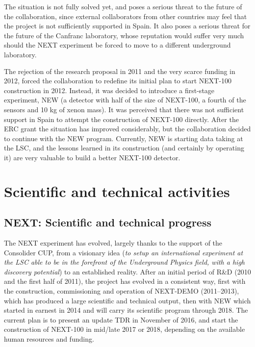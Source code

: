 \documentclass[a4paper,11pt,oneside]{article}
\begin{document}
The situation is not fully solved yet, and poses a serious threat to the future of the collaboration, since external collaborators from other countries may feel that the project is not sufficiently supported in Spain. It also poses a serious threat for the future of the Canfranc laboratory, whose reputation would suffer very much should the NEXT experiment be forced to move to a different underground laboratory. 

The rejection of the research proposal in 2011 and the very scarce funding in 2012, forced the collaboration to redefine its initial plan to start NEXT-100 construction in 2012. Instead, it was decided to introduce a first-stage experiment, NEW (a detector with half of the size of NEXT-100, a fourth of the sensors and 10 kg of xenon mass). It was perceived that there was not sufficient support in Spain to attempt the construction of NEXT-100 directly. After the ERC grant the situation has improved considerably, but the collaboration decided to continue with the NEW program. Currently, NEW is starting data taking at the LSC, and the lessons learned in its construction (and certainly by operating it) are very valuable to build a better NEXT-100 detector. 


\section{\bf \textsf{ Scientific and technical activities }} 

\subsection*{NEXT: Scientific and technical progress}

The NEXT experiment has evolved, largely thanks to the support of the Consolider CUP, from a visionary idea ({\em to setup an international experiment at the LSC able to be in the forefront of the Underground Physics field, with a high discovery potential}) to an established reality. After an initial period of R\&D (2010 and the first half of 2011), the project has evolved in a consistent way, first with the construction, commissioning and operation of NEXT-DEMO (2011--2013), which has produced a large scientific and technical output, then with NEW which started in earnest in 2014 and will carry its scientific program through 2018. The current plan is to present an update TDR in November of 2016, and start the construction of NEXT-100 in mid/late 2017 or 2018, depending on the available human resources and funding. 
 
\end{document}
